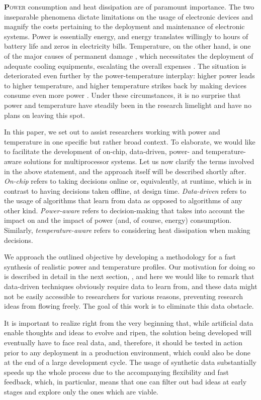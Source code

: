 \lettrine[findent=0.4em, nindent=0em]{\textbf{P}}{ower} consumption and heat
dissipation are of paramount importance. The two inseparable phenomena dictate
limitations on the usage of electronic devices and magnify the costs pertaining
to the deployment and maintenance of electronic systems. Power is essentially
energy, and energy translates willingly to hours of battery life and zeros in
electricity bills. Temperature, on the other hand, is one of the major causes of
permanent damage \cite{jedec}, which necessitates the deployment of adequate
cooling equipments, escalating the overall expenses \cite{chaudhry2015}. The
situation is deteriorated even further by the power-temperature interplay:
higher power leads to higher temperature, and higher temperature strikes back by
making devices consume even more power \cite{liu2007}. Under these
circumstances, it is no surprise that power and temperature have steadily been
in the research limelight and have no plans on leaving this spot.

In this paper, we set out to assist researchers working with power and
temperature in one specific but rather broad context. To elaborate, we would
like to facilitate the development of on-chip, data-driven, power- and
temperature-aware solutions for multiprocessor systems. Let us now clarify the
terms involved in the above statement, and the approach itself will be described
shortly after. \emph{On-chip} refers to taking decisions online or,
equivalently, at runtime, which is in contrast to having decisions taken
offline, at design time. \emph{Data-driven} refers to the usage of algorithms
that learn from data as opposed to algorithms of any other kind.
\emph{Power-aware} refers to decision-making that takes into account the impact
on and the impact of power (and, of course, energy) consumption. Similarly,
\emph{temperature-aware} refers to considering heat dissipation when making
decisions.

We approach the outlined objective by developing a methodology for a fast
synthesis of realistic power and temperature profiles. Our motivation for doing
so is described in detail in the next section, , and here we
would like to remark that data-driven techniques obviously require data to learn
from, and these data might not be easily accessible to researchers for various
reasons, preventing research ideas from flowing freely. The goal of this work is
to eliminate this data obstacle.

It is important to realize right from the very beginning that, while artificial
data enable thoughts and ideas to evolve and ripen, the solution being developed
will eventually have to face real data, and, therefore, it should be tested in
action prior to any deployment in a production environment, which could also be
done at the end of a large development cycle. The usage of synthetic data
substantially speeds up the whole process due to the accompanying flexibility
and fast feedback, which, in particular, means that one can filter out bad ideas
at early stages and explore only the ones which are viable.

